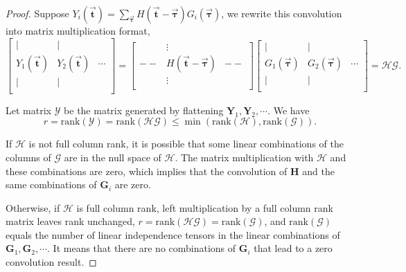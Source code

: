 \documentclass[twoside,11pt]{article}
\def\rank{\text{rank}}
\def\tvar#1{\mathbf{#1}} %
\def\vsymb#1{\vec{\mathbf{#1}}}
\begin{document}
\begin{proof}
  
    Suppose \(Y_i(\vsymb{t}) = \sum_{\vsymb{\tau}} H(\vsymb{t} - \vsymb{\tau}) G_i(\vsymb{\tau})\), we rewrite this convolution into matrix multiplication format,
    \begin{equation*}
      \begin{bmatrix}
        \vert          & \vert          &        \\
        Y_1(\vsymb{t}) & Y_2(\vsymb{t}) & \cdots \\
        \vert          & \vert          &        \\
      \end{bmatrix}
      =
      \begin{bmatrix}
             & \vdots                      &      \\
        -\!- & H(\vsymb{t} - \vsymb{\tau}) & -\!- \\
             & \vdots                      &      \\
      \end{bmatrix}
      \begin{bmatrix}
        \vert             & \vert             &        \\
        G_1(\vsymb{\tau}) & G_2(\vsymb{\tau}) & \cdots \\
        \vert             & \vert             &        \\
      \end{bmatrix}
      = \mathcal{H} \mathcal{G}.
    \end{equation*}
  

  
    Let matrix \(\mathcal{Y}\) be the matrix generated by flattening \(\tvar{Y}_1, \tvar{Y}_2, \cdots\). We have \citep{Horn1985}
    \begin{equation*}
      r
      = \rank(\mathcal{Y})
      = \rank(\mathcal{H} \mathcal{G})
      \le \min\left( \rank(\mathcal{H}), \rank(\mathcal{G})\right).
    \end{equation*}
  

  If \(\mathcal{H}\) is not full column rank, it is possible that some linear combinations of the columns of \(\mathcal{G}\) are in the null space of \(\mathcal{H}\). The matrix multiplication with \(\mathcal{H}\) and these combinations are zero, which implies that the convolution of \(\tvar{H}\) and the same combinations of \(\tvar{G}_i\) are zero.

  
    Otherwise, if \(\mathcal{H}\) is full column rank, left multiplication by a full column rank matrix leaves rank unchanged, \(r = \rank(\mathcal{H} \mathcal{G}) = \rank(\mathcal{G})\), and \(\rank(\mathcal{G})\) equals the number of linear independence tensors in the linear combinations of \(\tvar{G}_1, \tvar{G}_2, \cdots\). It means that there are no combinations of \(\tvar{G}_i\) that lead to a zero convolution result.
  
\end{proof}
\end{document}
